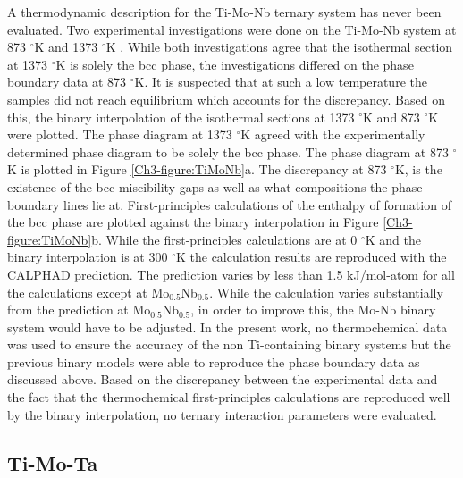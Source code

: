A thermodynamic description for the Ti-Mo-Nb ternary system has never been evaluated. Two experimental investigations were done on the Ti-Mo-Nb system at 873 $^\circ$K and 1373 $^\circ$K \cite{English1961,Prokoshkin1967}. While both investigations agree that the isothermal section at 1373 $^\circ$K is solely the bcc phase, the investigations differed on the phase boundary data at 873 $^\circ$K. It is suspected that at such a low temperature the samples did not reach equilibrium which accounts for the discrepancy. Based on this, the binary interpolation of the isothermal sections at 1373 $^\circ$K and 873 $^\circ$K were plotted. The phase diagram at 1373 $^\circ$K agreed with the experimentally determined phase diagram to be solely the bcc phase. The phase diagram at 873 $^\circ$K is plotted in Figure \ref{Ch3-figure:TiMoNb}a. The discrepancy at 873 $^\circ$K, is the existence of the bcc miscibility gaps as well as what compositions the phase boundary lines lie at. First-principles calculations of the enthalpy of formation of the bcc phase are plotted against the binary interpolation in Figure \ref{Ch3-figure:TiMoNb}b. While the first-principles calculations are at 0 $^\circ$K and the binary interpolation is at 300 $^\circ$K the calculation results are reproduced with the CALPHAD prediction. The prediction varies by less than 1.5 kJ/mol-atom for all the calculations except at Mo$_{0.5}$Nb$_{0.5}$. While the calculation varies substantially from the prediction at Mo$_{0.5}$Nb$_{0.5}$, in order to improve this, the Mo-Nb binary system would have to be adjusted. In the present work, no thermochemical data was used to ensure the accuracy of the non Ti-containing binary systems but the previous binary models were able to reproduce the phase boundary data as discussed above. Based on the discrepancy between the experimental data and the fact that the thermochemical first-principles calculations are reproduced well by the binary interpolation, no ternary interaction parameters were evaluated. 

\subsection{Ti-Mo-Ta}

